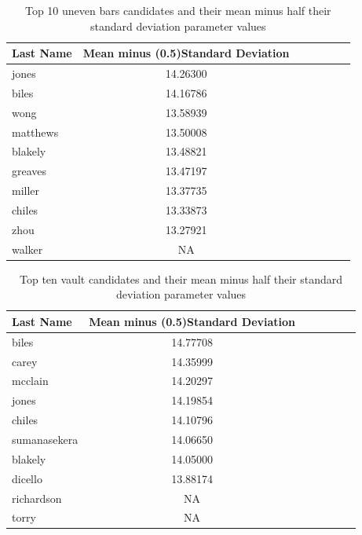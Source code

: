 \documentclass[12pt]{article}
\begin{document}
\begin{table}[tbp]
  \caption{Top 10 uneven bars candidates and their mean minus half their standard deviation parameter values}
  \label{tab:tableBBP}
\centering
\begin{tabular}[t]{lccllll}
 \toprule
Last Name & Mean minus (0.5)Standard Deviation\\
\midrule
jones & 14.26300\\
\midrule
biles & 14.16786\\
\midrule
wong & 13.58939\\
\midrule
matthews & 13.50008\\
\midrule
blakely & 13.48821\\
\midrule
greaves & 13.47197\\
\midrule
miller & 13.37735\\
\midrule
chiles & 13.33873\\
\midrule
zhou & 13.27921\\
\midrule
walker & NA\\
\bottomrule
\end{tabular}
\end{table}

\begin{table}[tbp]
  \caption{Top ten vault candidates and their mean minus half their standard deviation parameter values}
  \label{tab:tableBBP}
\centering
\begin{tabular}[t]{lccllll}
 \toprule
Last Name & Mean minus (0.5)Standard Deviation\\
\midrule
biles & 14.77708\\
\midrule
carey & 14.35999\\
\midrule
mcclain & 14.20297\\
\midrule
jones & 14.19854\\
\midrule
chiles & 14.10796\\
\midrule
sumanasekera & 14.06650\\
\midrule
blakely & 14.05000\\
\midrule
dicello & 13.88174\\
\midrule
richardson & NA\\
\midrule
torry & NA\\
\bottomrule
\end{tabular}
\end{table}
\end{document}
